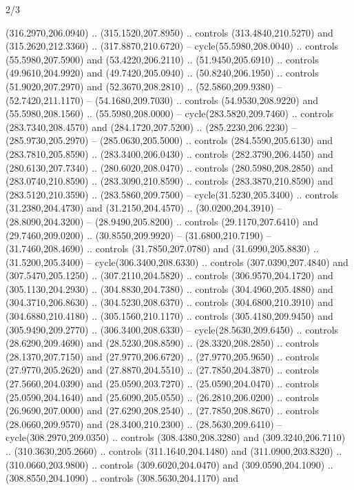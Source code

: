 \begin{flagdescription}{2/3}
\begin{scope}[xshift=0.5\flaglength,yshift=0.5\flagwidth,scale=\stretchfactor]
\begin{scope}[scale=0.001645\flagwidth,yshift=65mm,xshift=-63mm]
\begin{scope}[y=0.80pt, x=0.80pt, yscale=-1,]
\begin{scope}[cm={{1.33333,0.0,0.0,1.33333,(0.0,1e-05)}}]
  (316.2970,206.0940) .. (315.1520,207.8950) .. controls (313.4840,210.5270) and
  (315.2620,212.3360) .. (317.8870,210.6720) -- cycle(55.5980,208.0040) ..
  controls (55.5980,207.5900) and (53.4220,206.2110) .. (51.9450,205.6910) ..
  controls (49.9610,204.9920) and (49.7420,205.0940) .. (50.8240,206.1950) ..
  controls (51.9020,207.2970) and (52.3670,208.2810) .. (52.5860,209.9380) --
  (52.7420,211.1170) -- (54.1680,209.7030) .. controls (54.9530,208.9220) and
  (55.5980,208.1560) .. (55.5980,208.0000) -- cycle(283.5820,209.7460) ..
  controls (283.7340,208.4570) and (284.1720,207.5200) .. (285.2230,206.2230) --
  (285.9730,205.2970) -- (285.0630,205.5000) .. controls (284.5590,205.6130) and
  (283.7810,205.8590) .. (283.3400,206.0430) .. controls (282.3790,206.4450) and
  (280.6130,207.7340) .. (280.6020,208.0470) .. controls (280.5980,208.2850) and
  (283.0740,210.8590) .. (283.3090,210.8590) .. controls (283.3870,210.8590) and
  (283.5120,210.3590) .. (283.5860,209.7500) -- cycle(31.5230,205.3400) ..
  controls (31.2380,204.4730) and (31.2150,204.4570) .. (30.0200,204.3910) --
  (28.8090,204.3200) -- (28.9490,205.8200) .. controls (29.1170,207.6410) and
  (29.7460,209.0200) .. (30.8550,209.9920) -- (31.6800,210.7190) --
  (31.7460,208.4690) .. controls (31.7850,207.0780) and (31.6990,205.8830) ..
  (31.5200,205.3400) -- cycle(306.3400,208.6330) .. controls (307.0390,207.4840)
  and (307.5470,205.1250) .. (307.2110,204.5820) .. controls (306.9570,204.1720)
  and (305.1130,204.2930) .. (304.8830,204.7380) .. controls (304.4960,205.4880)
  and (304.3710,206.8630) .. (304.5230,208.6370) .. controls (304.6800,210.3910)
  and (304.6880,210.4180) .. (305.1560,210.1170) .. controls (305.4180,209.9450)
  and (305.9490,209.2770) .. (306.3400,208.6330) -- cycle(28.5630,209.6450) ..
  controls (28.6290,209.4690) and (28.5230,208.8590) .. (28.3320,208.2850) ..
  controls (28.1370,207.7150) and (27.9770,206.6720) .. (27.9770,205.9650) ..
  controls (27.9770,205.2620) and (27.8870,204.5510) .. (27.7850,204.3870) ..
  controls (27.5660,204.0390) and (25.0590,203.7270) .. (25.0590,204.0470) ..
  controls (25.0590,204.1640) and (25.6090,205.0550) .. (26.2810,206.0200) ..
  controls (26.9690,207.0000) and (27.6290,208.2540) .. (27.7850,208.8670) ..
  controls (28.0660,209.9570) and (28.3400,210.2300) .. (28.5630,209.6410) --
  cycle(308.2970,209.0350) .. controls (308.4380,208.3280) and
  (309.3240,206.7110) .. (310.3630,205.2660) .. controls (311.1640,204.1480) and
  (311.0900,203.8320) .. (310.0660,203.9800) .. controls (309.6020,204.0470) and
  (309.0590,204.1090) .. (308.8550,204.1090) .. controls (308.5630,204.1170) and

\end{scope}
\end{scope}
\end{scope}
\end{scope}
\end{flagdescription}
